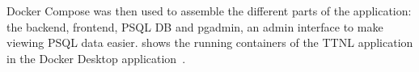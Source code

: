 Docker Compose was then used to assemble the different parts of the application: the backend, frontend, \acl{PSQL} \ac{DB} and pgadmin, an admin interface to make viewing \acl{PSQL} data easier.
 shows the running containers of the \ac{TTNL} application in the Docker Desktop application~\cite{docker_inc_download_2021}.










